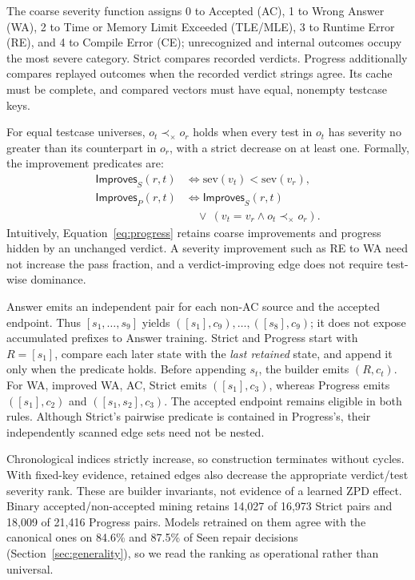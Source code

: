 \documentclass[10pt,conference]{IEEEtran}
\begin{document}
The coarse severity function assigns 0 to Accepted (AC), 1 to Wrong Answer (WA), 2 to Time or Memory Limit Exceeded (TLE/MLE), 3 to Runtime Error (RE), and 4 to Compile Error (CE); unrecognized and internal outcomes occupy the most severe category. Strict compares recorded verdicts. Progress additionally compares replayed outcomes when the recorded verdict strings agree. Its cache must be complete, and compared vectors must have equal, nonempty testcase keys.

For equal testcase universes, \(o_t\prec_\times o_r\) holds when every test in \(o_t\) has severity no greater than its counterpart in \(o_r\), with a strict decrease on at least one. Formally, the improvement predicates are:
\begin{equation}
\begin{aligned}
\mathsf{Improves}_S(r,t)&\iff \mathrm{sev}(v_t)<\mathrm{sev}(v_r),\\
\mathsf{Improves}_P(r,t)&\iff \mathsf{Improves}_S(r,t)\\
 &\quad\lor\ (v_t=v_r\land o_t\prec_\times o_r).
\end{aligned}
\label{eq:progress}
\end{equation}
Intuitively, Equation~\eqref{eq:progress} retains coarse improvements and progress hidden by an unchanged verdict. A severity improvement such as RE to WA need not increase the pass fraction, and a verdict-improving edge does not require test-wise dominance.

Answer emits an independent pair for each non-AC source and the accepted endpoint. Thus \([s_1,\ldots,s_9]\) yields \(([s_1],c_9),\ldots,([s_8],c_9)\); it does not expose accumulated prefixes to Answer training. Strict and Progress start with \(R=[s_1]\), compare each later state with the \emph{last retained} state, and append it only when the predicate holds. Before appending \(s_t\), the builder emits \((R,c_t)\). For WA, improved WA, AC, Strict emits \(([s_1],c_3)\), whereas Progress emits \(([s_1],c_2)\) and \(([s_1,s_2],c_3)\). The accepted endpoint remains eligible in both rules. Although Strict's pairwise predicate is contained in Progress's, their independently scanned edge sets need not be nested.

Chronological indices strictly increase, so construction terminates without cycles. With fixed-key evidence, retained edges also decrease the appropriate verdict/test severity rank. These are builder invariants, not evidence of a learned ZPD effect. Binary accepted/non-accepted mining retains 14,027 of 16,973 Strict pairs and 18,009 of 21,416 Progress pairs. Models retrained on them agree with the canonical ones on 84.6\% and 87.5\% of Seen repair decisions (Section~\ref{sec:generality}), so we read the ranking as operational rather than universal.
\end{document}
